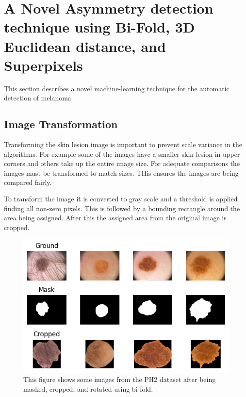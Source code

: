 

\section{A Novel Asymmetry detection technique using Bi-Fold, 3D Euclidean distance, and Superpixels}
This section describes a novel machine-learning technique for the automatic detection of melanoma

\subsection{Image Transformation}
Transforming the skin lesion image is important to prevent scale variance in the algorithms. For example some of the images have a smaller skin lesion in upper corners and others take up the entire image size. For adequate comparisons the images must be transformed to match sizes. THis ensures the images are being compared fairly.

To transform the image it is converted to gray scale and a threshold is applied finding all non-zero pixels. This is followed by a bounding rectangle around the area being assigned. After this the assigned area from the original image is cropped.

\begin{figure}
    \centering
    \includegraphics[scale=1.2]{images/asymmetry/asy-cropped.png}
    \caption{This figure shows some images from the PH2 dataset after being masked, cropped, and rotated using bi-fold.} 
\end{figure}\label{asy-cropped}

